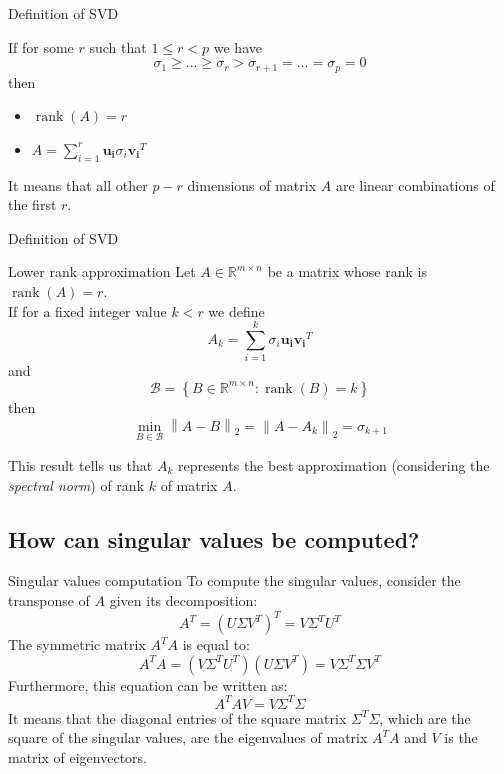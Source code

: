 \documentclass[10pt]{beamer}
\DeclareMathOperator{\rank}{rank}
\begin{document}
\begin{frame}{Definition of SVD}
    \begin{theorem}
        If for some $r$ such that $ 1 \le r < p $ we have
        $$ \sigma_1 \ge \ldots \ge \sigma_{r} > \sigma_{r + 1} = \ldots = \sigma_p = 0  $$
        then
        \begin{itemize}
            \item $\rank(A) = r$
            \item $ A = \sum \limits_{i = 1}^{r} \bm{u_i} \sigma_i \bm{v_i}^T $
        \end{itemize}
    \end{theorem}

    It means that all other $p-r$ dimensions of matrix $A$ are linear combinations of the first $r$.
\end{frame}

\begin{frame}{Definition of SVD}
    \begin{block}{Lower rank approximation}
        Let $A \in \mathbb{R}^{m \times n}$ be a matrix whose rank is $\rank(A) = r$. \\
        If for a fixed integer value $k < r$ we define
        \begin{equation}
            \label{eq:lower_rank}
            A_k = \sum \limits_{i = 1}^{k} \sigma_i \bm{u_i}  \bm{v_i}^T 
        \end{equation}
        and
        $$ \mathcal{B} = \left\{ B \in \mathbb{R}^{m \times n} : \rank(B) = k \right\}$$
        then 
        $$ \min_{B \in \mathcal{B}} \left\lVert A - B \right\rVert _2 = \left\lVert A - A_k \right\rVert _2 = \sigma_{k + 1} $$
    \end{block}
        
    This result tells us that $A_k$ represents the best approximation (considering the \textit{spectral norm}) of rank $k$ of matrix $A$.
\end{frame}

\subsection{How can singular values be computed?}

\begin{frame}{Singular values computation}
    To compute the singular values, consider the transponse of $A$ given its decomposition:
    $$ A^T = (U \Sigma V^T)^T = V \Sigma^T U^T$$
    The symmetric matrix $A^T A$ is equal to:
    $$ A^T A = ( V \Sigma^T U^T )(U \Sigma V^T) = V \Sigma^T \Sigma V^T$$
    Furthermore, this equation can be written as:
    $$ A^T A V = V \Sigma^T \Sigma $$
    It means that the diagonal entries of the square matrix $ \Sigma^T \Sigma $, which are the square of the singular values, are the eigenvalues of matrix $A^T A$ and $ V $ is the matrix of eigenvectors.
\end{frame}
\end{document}
